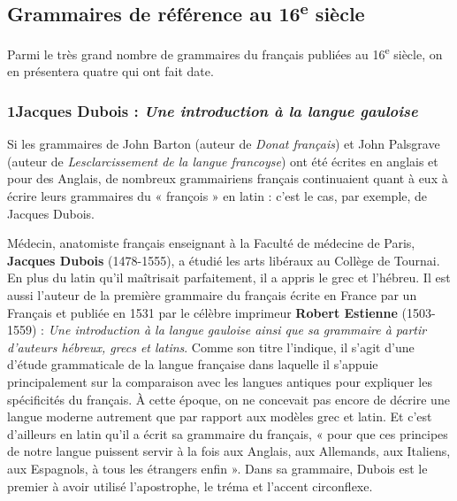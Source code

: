 \subsection{Grammaires de référence au 16\textsuperscript{e} siècle}
Parmi le très grand nombre de grammaires du français publiées au 16\textsuperscript{e} siècle, on en présentera quatre qui ont fait date.
\subsubsection*{1\quad Jacques Dubois : \textit{Une introduction à la langue gauloise}}
Si les grammaires de John Barton (auteur de \textit{Donat français}) et John Palsgrave (auteur de \textit{Lesclarcissement de la langue francoyse}) ont été écrites en anglais et pour des Anglais, de nombreux grammairiens français continuaient quant à eux à écrire leurs grammaires du « françois » en latin : c’est le cas, par exemple, de Jacques Dubois.

Médecin, anatomiste français enseignant à la Faculté de médecine de Paris, \textbf{Jacques Dubois} (1478-1555), a étudié les arts libéraux au Collège de Tournai. En plus du latin qu’il maîtrisait parfaitement, il a appris le grec et l’hébreu. Il est aussi l’auteur de la première grammaire du français écrite en France par un Français et publiée en 1531 par le célèbre imprimeur \textbf{Robert Estienne} (1503-1559) : \textit{Une introduction à la langue gauloise ainsi que sa grammaire à partir d’auteurs hébreux, grecs et latins}. Comme son titre l’indique, il s’agit d’une d’étude grammaticale de la langue française dans laquelle il s’appuie principalement sur la comparaison avec les langues antiques pour expliquer les spécificités du français. À cette époque, on ne concevait pas encore de décrire une langue moderne autrement que par rapport aux modèles grec et latin. Et c’est d’ailleurs en latin qu’il a écrit sa grammaire du français, « pour que ces principes de notre langue puissent servir à la fois aux Anglais, aux Allemands, aux Italiens, aux Espagnols, à tous les étrangers enfin ». Dans sa grammaire, Dubois est le premier à avoir utilisé l’apostrophe, le tréma et l’accent circonflexe.
